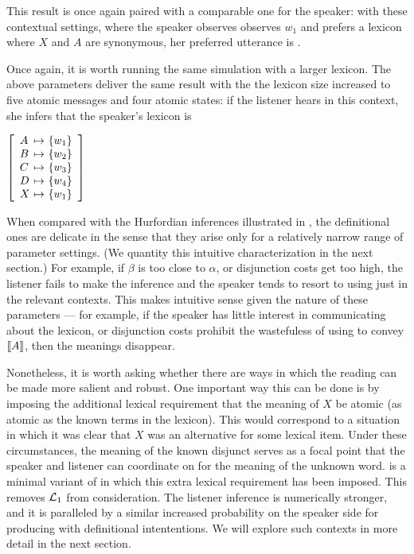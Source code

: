 \documentclass{article}
\begin{document}
This result is once again paired with a comparable one for the
speaker: with these contextual settings, where the speaker observes
observes $w_{1}$ and prefers a lexicon where $X$ and $A$ are
synonymous, her preferred utterance is .

Once again, it is worth running the same simulation with a larger
lexicon. The above parameters deliver the same result with the the
lexicon size increased to five atomic messages and four atomic states:
if the listener hears  in this context, she infers
that the speaker's lexicon is 
%
\begin{examples}
\item\label{def-lex-large}
  $\left[
    \begin{array}[c]{l@{ \ \mapsto \ }l}
      A & \set{w_{1}} \\
      B & \set{w_{2}} \\
      C & \set{w_{3}} \\
      D & \set{w_{4}} \\
      X & \set{w_{1}}
    \end{array}
  \right]$
\end{examples}

When compared with the Hurfordian inferences illustrated in
, the definitional ones are delicate
in the sense that they arise only for a relatively narrow range of
parameter settings. (We quantity this intuitive characterization in
the next section.) For example, if $\beta$ is too close to $\alpha$,
or disjunction costs get too high, the listener fails to make the
inference and the speaker tends to resort to using just  in
the relevant contexts. This makes intuitive sense given the nature of
these parameters --- for example, if the speaker has little interest
in communicating about the lexicon, or disjunction costs prohibit the
wastefuless of using  to convey $\llbracket A\rrbracket$, then the
meanings disappear. 

Nonetheless, it is worth asking whether there are ways in which the
reading can be made more salient and robust. One important way this
can be done is by imposing the additional lexical requirement that the
meaning of $X$ be atomic (as atomic as the known terms in the
lexicon). This would correspond to a situation in which it was clear
that $X$ was an alternative for some lexical item. Under these
circumstances, the meaning of the known disjunct serves as a focal
point that the speaker and listener can coordinate on for the meaning
of the unknown word.  is a minimal variant of
 in which this extra lexical requirement has been
imposed. This removes $\mathcal{L}_{1}$ from consideration. The listener
inference is numerically stronger, and it is paralleled by a similar
increased probability on the speaker side for producing 
with definitional intententions. We will explore such contexts in more
detail in the next section.
\end{document}
